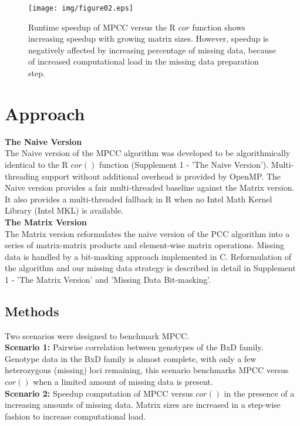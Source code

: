 \documentclass{bioinfo}
\begin{document}
\begin{figure}[!t]
  \centerline{\texttt{[image: img/figure02.eps]}}
  \vspace*{-7mm}
  \caption{
    Runtime speedup of MPCC versus the R $cor$ function shows
    increasing speedup with growing matrix sizes. However,
    speedup is negatively affected by increasing percentage of
    missing data, because of increased computational load in the
    missing data preparation step.
  }
  \label{fig:fig2}
  \vspace*{-5mm}
\end{figure}

\section{Approach}

\textbf{The Naive Version}\\
The Naive version of the MPCC algorithm was developed to be
algorithmically identical to the R $cor()$ function (Supplement 1 -
'The Naive Version'). Multi-threading support without additional
overhead is provided by OpenMP. The Naive version provides a fair
multi-threaded baseline against the Matrix version. It also provides a
multi-threaded fallback in R when no Intel\textregistered{} Math
Kernel Library (Intel\textregistered{} MKL) is available.\\
\textbf{The Matrix Version}\\
The Matrix version reformulates the naive version of the PCC algorithm
into a series of matrix-matrix products and element-wise matrix operations.
Missing data is handled by a bit-masking approach implemented in C.
Reformulation of the algorithm and our missing data strategy is described
in detail in Supplement 1 - 'The Matrix Version' and 'Missing Data Bit-masking'.

\vspace*{-5mm}

\begin{methods}

\section{Methods}
Two scenarios were designed to benchmark MPCC.\\ {\bf Scenario 1:}
Pairwise correlation between genotypes of the BxD family.  Genotype
data in the BxD family is almost complete, with only a few
heterozygous (missing) loci remaining, this scenario benchmarks MPCC
versus $cor()$ when a limited amount of missing data is present.\\
{\bf Scenario 2:} Speedup computation of MPCC versus $cor()$ in the
presence of a increasing amounts of missing data. Matrix sizes are
increased in a step-wise fashion to increase computational load.
\end{methods}
\end{document}
